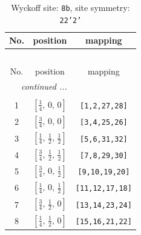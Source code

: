 \documentclass[fleqn,8pt]{jsarticle}
\begin{document}
\begin{longtable}{ccc}
\caption{Wyckoff site: {\tt 8b}, site symmetry: {\tt 22'2'}}
 \\
 \hline \hline
No. & position & mapping \\ \hline \endfirsthead

\multicolumn{2}{l}{\tablename\ \thetable{}} \\
 \hline \hline
No. & position & mapping \\ \hline \endhead

 \hline \hline
\multicolumn{2}{r}{\footnotesize\it continued ...} \\ \endfoot

 \hline \hline
\multicolumn{2}{r}{} \\ \endlastfoot

1 & $\left[ \frac{1}{4},\, 0,\, 0 \right]$ & {\tt [1,2,27,28]} \\ \hline
2 & $\left[ \frac{3}{4},\, 0,\, 0 \right]$ & {\tt [3,4,25,26]} \\ \hline
3 & $\left[ \frac{1}{4},\, \frac{1}{2},\, \frac{1}{2} \right]$ & {\tt [5,6,31,32]} \\ \hline
4 & $\left[ \frac{3}{4},\, \frac{1}{2},\, \frac{1}{2} \right]$ & {\tt [7,8,29,30]} \\ \hline
5 & $\left[ \frac{3}{4},\, 0,\, \frac{1}{2} \right]$ & {\tt [9,10,19,20]} \\ \hline
6 & $\left[ \frac{1}{4},\, 0,\, \frac{1}{2} \right]$ & {\tt [11,12,17,18]} \\ \hline
7 & $\left[ \frac{3}{4},\, \frac{1}{2},\, 0 \right]$ & {\tt [13,14,23,24]} \\ \hline
8 & $\left[ \frac{1}{4},\, \frac{1}{2},\, 0 \right]$ & {\tt [15,16,21,22]} \\
\end{longtable}
\renewcommand{\arraystretch}{1.2}
\end{document}
